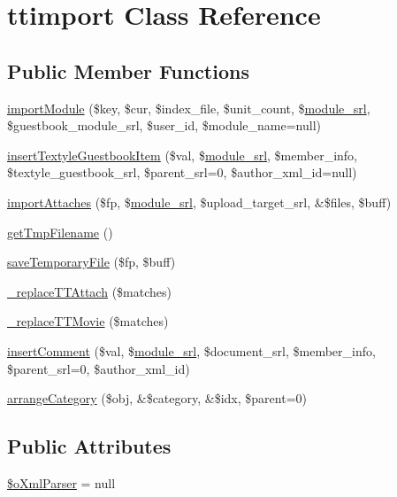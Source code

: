 \hypertarget{classttimport}{\section{ttimport Class Reference}
\label{classttimport}
}
\subsection*{Public Member Functions}
\begin{DoxyCompactItemize}
\item 
\hyperlink{classttimport_a9b625191007ff2039b86e7dc770ba3e9}{import\+Module} (\$key, \$cur, \$index\+\_\+file, \$unit\+\_\+count, \$\hyperlink{ko_8install_8php_a370bb6450fab1da3e0ed9f484a38b761}{module\+\_\+srl}, \$guestbook\+\_\+module\+\_\+srl, \$user\+\_\+id, \$module\+\_\+name=null)
\item 
\hyperlink{classttimport_a617885a3204e6697e3e6c681377c4e89}{insert\+Textyle\+Guestbook\+Item} (\$val, \$\hyperlink{ko_8install_8php_a370bb6450fab1da3e0ed9f484a38b761}{module\+\_\+srl}, \$member\+\_\+info, \$textyle\+\_\+guestbook\+\_\+srl, \$parent\+\_\+srl=0, \$author\+\_\+xml\+\_\+id=null)
\item 
\hyperlink{classttimport_a8b585ce5c93947bd9a4a1f6240c55f58}{import\+Attaches} (\$fp, \$\hyperlink{ko_8install_8php_a370bb6450fab1da3e0ed9f484a38b761}{module\+\_\+srl}, \$upload\+\_\+target\+\_\+srl, \&\$files, \$buff)
\item 
\hyperlink{classttimport_aa122afd62b775486ec56276e96ad7ddb}{get\+Tmp\+Filename} ()
\item 
\hyperlink{classttimport_a1b234f17517d13e725bfd53d17f4debd}{save\+Temporary\+File} (\$fp, \$buff)
\item 
\hyperlink{classttimport_a14327afa66ec130f1a0be24a7b5c7160}{\+\_\+replace\+T\+T\+Attach} (\$matches)
\item 
\hyperlink{classttimport_a30eac1bf295a9bfd0a7bc60292a07f06}{\+\_\+replace\+T\+T\+Movie} (\$matches)
\item 
\hyperlink{classttimport_a44b3596d067ce3a7321537829a1df835}{insert\+Comment} (\$val, \$\hyperlink{ko_8install_8php_a370bb6450fab1da3e0ed9f484a38b761}{module\+\_\+srl}, \$document\+\_\+srl, \$member\+\_\+info, \$parent\+\_\+srl=0, \$author\+\_\+xml\+\_\+id)
\item 
\hyperlink{classttimport_a988c2841f6e8e28be78ce8f9eed7e57d}{arrange\+Category} (\$obj, \&\$category, \&\$idx, \$parent=0)
\end{DoxyCompactItemize}
\subsection*{Public Attributes}
\begin{DoxyCompactItemize}
\item 
\hyperlink{classttimport_af3932f8dbd65a917d2d41e001bae4e87}{\$o\+Xml\+Parser} = null
\end{DoxyCompactItemize}


